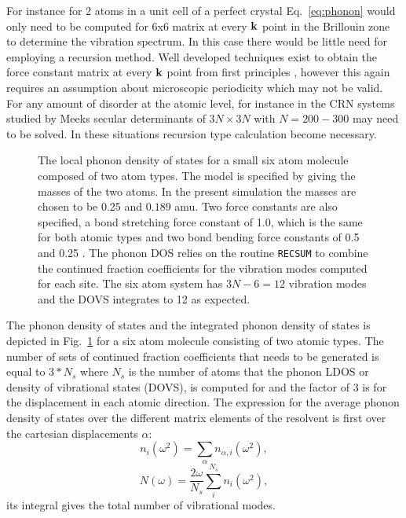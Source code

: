 For instance for 2 atoms in a unit cell of a perfect 
crystal Eq.~\ref{eq:phonon} would only
need to be computed for 6x6 matrix at every ${\bf k}$ point 
in the Brillouin zone to determine the vibration spectrum. 
In this case there would be little need for employing a recursion method.
Well developed techniques exist to obtain the force constant 
matrix at every ${\bf k}$ point from first principles \cite{baroni01}, 
however this again requires an assumption about
microscopic periodicity which may not be valid. For any amount of 
disorder at the atomic level, for instance in the CRN systems 
studied by Meeks secular determinants of $3N\times3N$ with
$N=200-300$ may need to be solved. In these situations recursion 
type calculation become necessary.
%
\begin{figure}
\begin{center}
{\graphicspath{{./invariance/rec_examples/phonon/}}}
\caption{The local phonon density of states for a small six atom molecule 
composed of two atom types. The model is specified by giving the 
masses of the two atoms. In the present simulation 
the masses are chosen to be 0.25 and $0.189$ amu. Two force constants are also
specified, a bond stretching force constant of 1.0, 
which is the same for both atomic types
and two bond bending force constants of 0.5 and 0.25 \label{fig:phonondos}. 
The phonon DOS relies on the routine
\texttt{RECSUM} to combine the continued fraction coefficients 
for the vibration modes computed for each site. 
The six atom system has $3N-6=12$ vibration modes and the 
DOVS integrates to 12 as expected.}
\end{center}
\end{figure}
%
The phonon density of states and the integrated phonon density of 
states is depicted in Fig.~\ref{fig:phonondos} 
for a six atom molecule consisting of two atomic types. The number of 
sets of continued fraction coefficients
that needs to be generated is equal to $3*N_{s}$ where $N_{s}$ 
is the number of atoms that the phonon LDOS
or density of vibrational states (DOVS), is computed 
for and the factor of 3 is for the displacement in each 
atomic direction. The expression for the average phonon density of states
over the different matrix elements of the resolvent 
is first over the cartesian displacements $\alpha$:
%
\begin{equation}
n_{i}(\omega^{2}) = \sum_{\alpha}n_{\alpha,i}(\omega^{2}),
\end{equation}
%
\begin{equation}
N(\omega) = \frac{2\omega}{N_{s}}\sum_{i}^{N_{s}}n_{i}(\omega^{2}),
\end{equation}
%
its integral gives the total number of vibrational modes.

